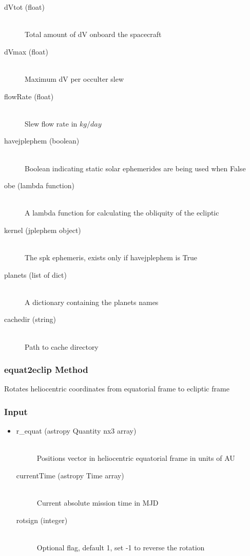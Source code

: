 \documentclass[cleanfoot]{asme2ej}
\begin{document}
\begin{itemize}
\begin{description}
    \item[dVtot (float)] \hfill \\ Total amount of dV onboard the spacecraft
    \item[dVmax (float)] \hfill \\ Maximum dV per occulter slew
    \item[flowRate (float)] \hfill \\ Slew flow rate in $kg/day$
    \item[havejplephem (boolean)] \hfill \\ Boolean indicating static solar ephemerides are being used when False
    \item[obe (lambda function)] \hfill \\ A lambda function for calculating the obliquity of the ecliptic
    \item[kernel (jplephem object)] \hfill \\ The spk ephemeris, exists only if havejplephem is True
    \item[planets (list of dict)] \hfill \\ A dictionary containing the planets names
    \item[cachedir (string)] \hfill \\ Path to cache directory
\end{description}
\end{itemize}

\subsubsection{equat2eclip Method} \label{sec:equat2eclip}
Rotates heliocentric coordinates from equatorial frame to ecliptic frame
\subsubsection*{Input}
\begin{itemize}
\item
\begin{description}
    \item[r\_equat (astropy Quantity nx3 array)] \hfill \\ Positions vector in heliocentric equatorial frame in units of AU
    \item[currentTime (astropy Time array)] \hfill \\ Current absolute mission time in MJD
    \item[rotsign (integer)] \hfill \\ Optional flag, default 1, set -1 to reverse the rotation
\end{description}
\end{itemize}
\end{document}
